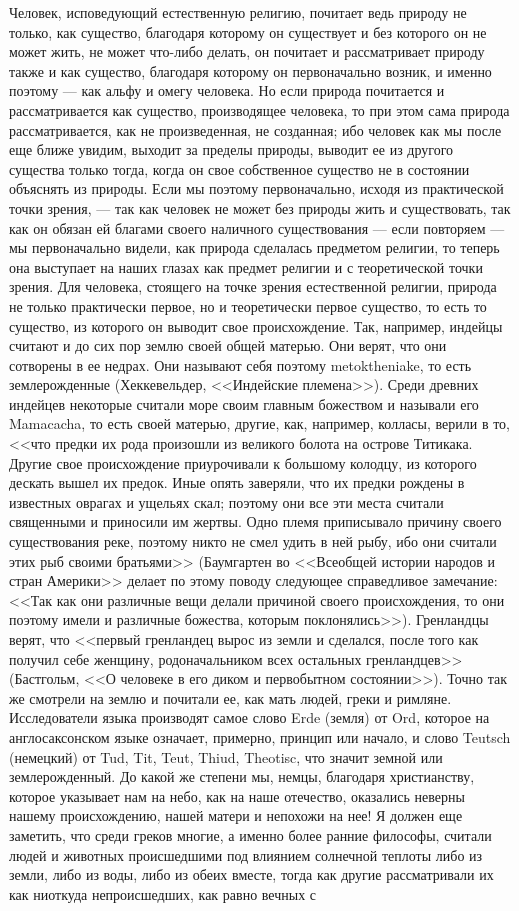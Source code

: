\documentclass[12pt]{article}
\begin{document}
Человек, исповедующий естественную религию, почитает ведь природу не только, как существо, благодаря которому он существует и без которого он не может жить, не может что-либо делать, он почитает и рассматривает природу также и как существо, благодаря которому он первоначально возник, и именно поэтому --- как альфу и омегу человека. Но если природа почитается и рассматривается как существо, производящее человека, то при этом сама природа рассматривается, как не произведенная, не созданная; ибо человек как мы после еще ближе увидим, выходит за пределы природы, выводит ее из другого существа только тогда, когда он свое собственное существо не в состоянии объяснять из природы. Если мы поэтому первоначально, исходя из практической точки зрения, --- так как человек не может без природы жить и существовать, так как он обязан ей благами своего наличного существования --- если повторяем --- мы первоначально видели, как природа сделалась предметом религии, то теперь она выступает на наших глазах как предмет религии и с теоретической точки зрения. Для человека, стоящего на точке зрения естественной религии, природа не только практически первое, но и теоретически первое существо, то есть то существо, из которого он выводит свое происхождение. Так, например, индейцы считают и до сих пор землю своей общей матерью. Они верят, что они сотворены в ее недрах. Они называют себя поэтому metoktheniake, то есть землерожденные (Хеккевельдер, <<Индейские племена>>). Среди древних индейцев некоторые считали море своим главным божеством и называли его Mamacacha, то есть своей матерью, другие, как, например, колласы, верили в то, <<что предки их рода произошли из великого болота на острове Титикака. Другие свое происхождение приурочивали к большому колодцу, из которого дескать вышел их предок. Иные опять заверяли, что их предки рождены в известных оврагах и ущельях скал; поэтому они все эти места считали священными и приносили им жертвы. Одно племя приписывало причину своего существования реке, поэтому никто не смел удить в ней рыбу, ибо они считали этих рыб своими братьями>> (Баумгартен во <<Всеобщей истории народов и стран Америки>> делает по этому поводу следующее справедливое замечание: <<Так как они различные вещи делали причиной своего происхождения, то они поэтому имели и различные божества, которым поклонялись>>). Гренландцы верят, что <<первый гренландец вырос из земли и сделался, после того как получил себе женщину, родоначальником всех остальных гренландцев>> (Бастгольм, <<О человеке в его диком и первобытном состоянии>>). Точно так же смотрели на землю и почитали ее, как мать людей, греки и римляне. Исследователи языка производят самое слово Erde (земля) от Ord, которое на англосаксонском языке означает, примерно, принцип или начало, и слово Teutsch (немецкий) от Tud, Tit, Teut, Thiud, Theotisc, что значит земной или землерожденный. До какой же степени мы, немцы, благодаря христианству, которое указывает нам на небо, как на наше отечество, оказались неверны нашему происхождению, нашей матери и непохожи на нее! Я должен еще заметить, что среди греков многие, а именно более ранние философы, считали людей и животных происшедшими под влиянием солнечной теплоты либо из земли, либо из воды, либо из обеих вместе, тогда как другие рассматривали их как ниоткуда непроисшедших, как равно вечных с 
\end{document}
